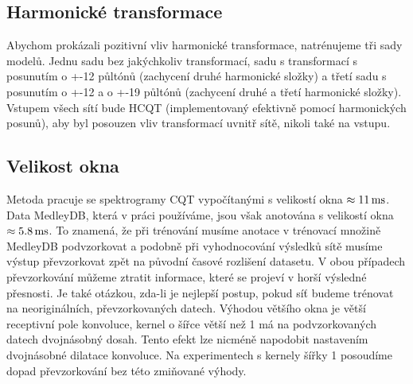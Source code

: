 \subsection{Harmonické transformace}

Abychom prokázali pozitivní vliv harmonické transformace, natrénujeme tři sady modelů. Jednu sadu bez jakýchkoliv transformací, sadu s transformací s posunutím o +-12 půltónů (zachycení druhé harmonické složky) a třetí sadu s posunutím o +-12 a o +-19 půltónů (zachycení druhé a třetí harmonické složky). Vstupem všech sítí bude HCQT (implementovaný efektivně pomocí harmonických posunů), aby byl posouzen vliv transformací uvnitř sítě, nikoli také na vstupu.



\subsection{Velikost okna}

Metoda \cite{Bittner2017} pracuje se spektrogramy CQT vypočítanými s velikostí okna $\approx 11\,\rm ms$. Data MedleyDB, která v práci používáme, jsou však anotována s velikostí okna $\approx 5.8\,\rm ms$. To znamená, že při trénování musíme anotace v trénovací množině MedleyDB podvzorkovat a podobně při vyhodnocování výsledků sítě musíme výstup převzorkovat zpět na původní časové rozlišení datasetu. V obou případech převzorkování můžeme ztratit informace, které se projeví v horší výsledné přesnosti. Je také otázkou, zda-li je nejlepší postup, pokud síť budeme trénovat na neoriginálních, převzorkovaných datech. Výhodou většího okna je větší receptivní pole konvoluce, kernel o šířce větší než 1 má na podvzorkovaných datech dvojnásobný dosah. Tento efekt lze nicméně napodobit nastavením dvojnásobné dilatace konvoluce. Na experimentech s kernely šířky 1 posoudíme dopad převzorkování bez této zmiňované výhody.

